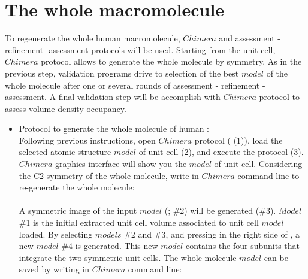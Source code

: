 \section{The whole macromolecule}

To regenerate the whole human  macromolecule, $Chimera$  and assessment - refinement -assessment protocols will be used. Starting from the unit cell, $Chimera$  protocol allows to generate the whole molecule by symmetry. As in the previous step, validation programs drive to selection of the best $model$ of the whole molecule after one or several rounds of assessment - refinement -assessment. A final validation step will be accomplish with $Chimera$  protocol to assess volume density occupancy.

\begin{itemize}

 \item Protocol  to generate the whole molecule of human :\\
 
 Following previous instructions, open $Chimera$  protocol ( (1)), load 
 the selected atomic structure $model$ of  unit cell (2), and execute the protocol (3). $Chimera$ graphics interface will show you the $model$ of  unit cell. Considering the C2 symmetry of the whole molecule, write in $Chimera$ command line to re-generate the whole molecule:\\
 
 \\
 
 A symmetric image of the input $model$ (; \#2) will be generated (\#3). $Model$ \#1 is the initial extracted unit cell volume associated to  unit cell $model$ loaded. By selecting $models$ \#2 and \#3, and pressing  in the right side of , a new $model$ \#4 is generated. This new $model$ contains the four subunits that integrate the two symmetric unit cells. The whole molecule $model$ can be saved by writing in $Chimera$ command line:\\
 
 \\
 

\end{itemize}
